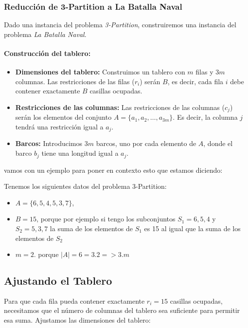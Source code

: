\subsubsection*{Reducción de 3-Partition a La Batalla Naval}

Dado una instancia del problema \textit{3-Partition}, construiremos una instancia del problema \textit{La Batalla Naval}.

\paragraph{Construcción del tablero:}
\begin{itemize}
    \item \textbf{Dimensiones del tablero:} Construimos un tablero con \(m\) filas y \(3m\) columnas. Las restricciones de las filas (\(r_i\)) serán \(B\), es decir, cada fila \(i\) debe contener exactamente \(B\) casillas ocupadas.
    \item \textbf{Restricciones de las columnas:} Las restricciones de las columnas (\(c_j\)) serán los elementos del conjunto \(A = \{a_1, a_2, \dots, a_{3m}\}\). Es decir, la columna \(j\) tendrá una restricción igual a \(a_j\).
    \item \textbf{Barcos:} Introducimos \(3m\) barcos, uno por cada elemento de \(A\), donde el barco \(b_j\) tiene una longitud igual a \(a_j\).
\end{itemize}

vamos con un ejemplo para poner en contexto esto que estamos diciendo:

\vskip0.5cm
Tenemos los siguientes datos del problema 3-Partition: 

\begin{itemize}
    \item $A = \{6, 5, 4, 5, 3, 7\}$,
    \item $B = 15$, porque por ejemplo si tengo los subconjuntos $S_{1}={6,5,4}$ y $S_{2}={5,3,7}$ la suma de los elementos de $S_{1}$ es 15 al igual que la suma de los elementos de $S_{2}$ 
    \item $m = 2$. porque $|A| = 6 = 3.2 => 3.m$
\end{itemize}

\subsection*{Ajustando el Tablero}

Para que cada fila pueda contener exactamente $r_i = 15$ casillas ocupadas, necesitamos que el número de columnas del tablero sea suficiente para permitir esa suma. Ajustamos las dimensiones del tablero:

